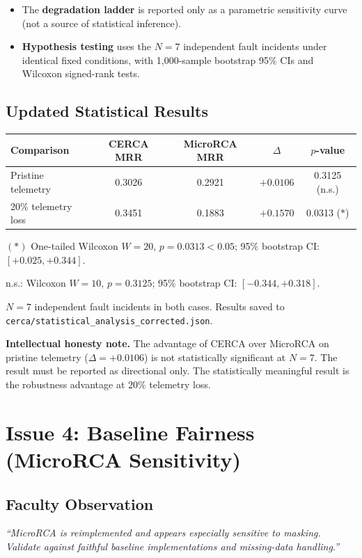 \documentclass[11pt,a4paper]{article}
\newcommand{\tb}[1]{\textbf{#1}}
\begin{document}
\begin{itemize}[leftmargin=1.5em,itemsep=2pt]
  \item The \textbf{degradation ladder} is reported only as a parametric sensitivity curve (not a source of statistical inference).
  \item \textbf{Hypothesis testing} uses the $N=7$ independent fault incidents under identical fixed conditions, with 1,000-sample bootstrap 95\% CIs and Wilcoxon signed-rank tests.
\end{itemize}

\subsection{Updated Statistical Results}

\begin{center}\small
\begin{tabular}{|L{4.2cm}|c|c|c|c|}
\hline
\tb{Comparison} & \tb{CERCA MRR} & \tb{MicroRCA MRR} & \tb{$\Delta$} & \tb{$p$-value} \\ \hline
Pristine telemetry & 0.3026 & 0.2921 & $+0.0106$ & 0.3125 (n.s.) \\ \% telemetry loss & 0.3451 & 0.1883 & $+0.1570$ & 0.0313 ($*$) \\ \hline
\end{tabular}
\end{center}

{\footnotesize $(*)$ One-tailed Wilcoxon $W=20$, $p=0.0313 < 0.05$; 95\% bootstrap CI: $[+0.025, +0.344]$.\par
n.s.: Wilcoxon $W=10$, $p=0.3125$; 95\% bootstrap CI: $[-0.344, +0.318]$.\par
$N=7$ independent fault incidents in both cases. Results saved to \texttt{cerca/statistical\_analysis\_corrected.json}.}

\textbf{Intellectual honesty note.} The advantage of CERCA over MicroRCA on pristine telemetry ($\Delta=+0.0106$) is not statistically significant at $N=7$. The result must be reported as directional only. The statistically meaningful result is the robustness advantage at 20\% telemetry loss.

\section{Issue 4: Baseline Fairness (MicroRCA Sensitivity)}

\subsection{Faculty Observation}
\textit{``MicroRCA is reimplemented and appears especially sensitive to masking. Validate against faithful baseline implementations and missing-data handling.''}
\end{document}

